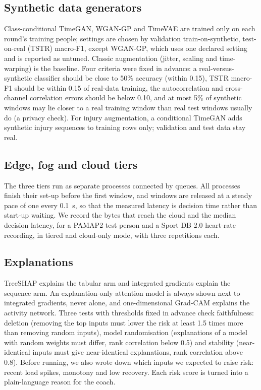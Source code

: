 \documentclass[12pt,a4paper]{article}
\begin{document}
\subsection{Synthetic data generators}
Class-conditional TimeGAN, WGAN-GP and TimeVAE are trained only on each round's training
people; settings are chosen by validation train-on-synthetic, test-on-real (TSTR) macro-F1, except
WGAN-GP, which uses one declared setting and is reported as untuned. Classic augmentation
(jitter, scaling and time-warping) is the baseline. Four criteria were fixed in advance: a
real-versus-synthetic classifier should be close to 50\% accuracy (within 0.15), TSTR macro-F1
should be within 0.15 of real-data training, the autocorrelation and cross-channel correlation
errors should be below 0.10, and at most 5\% of synthetic windows may lie closer to a real
training window than real test windows usually do (a privacy check). For injury augmentation, a
conditional TimeGAN adds synthetic injury sequences to training rows only; validation and test
data stay real.

\subsection{Edge, fog and cloud tiers}
The three tiers run as separate processes connected by queues. All processes finish their
set-up before the first window, and windows are released at a steady pace of one every 0.1~s, so
that the measured latency is decision time rather than start-up waiting. We record the bytes that
reach the cloud and the median decision latency, for a PAMAP2 test person and a Sport DB 2.0
heart-rate recording, in tiered and cloud-only mode, with three repetitions each.

\subsection{Explanations}
TreeSHAP explains the tabular arm and integrated gradients explain the sequence arm. An
explanation-only attention model is always shown next to integrated gradients, never alone, and
one-dimensional Grad-CAM explains the activity network. Three tests with thresholds fixed in
advance check faithfulness: deletion (removing the top inputs must lower the risk at least 1.5
times more than removing random inputs), model randomisation (explanations of a model with random
weights must differ, rank correlation below 0.5) and stability (near-identical inputs must give
near-identical explanations, rank correlation above 0.8). Before running, we also wrote down
which inputs we expected to raise risk: recent load spikes, monotony and low recovery. Each risk
score is turned into a plain-language reason for the coach.
\end{document}
